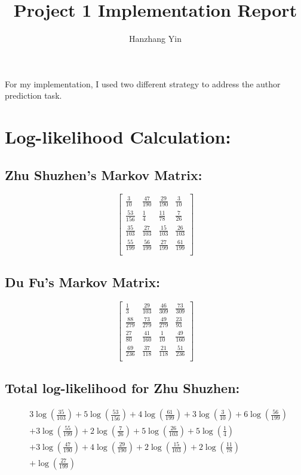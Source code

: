 \documentclass[12pt]{article}
\title{\vspace{-2cm}Project 1 Implementation Report}
\author{Hanzhang Yin}
\begin{document}
\maketitle

\noindent For my implementation, I used two different strategy to address the author prediction task.

\section*{Log-likelihood Calculation: }

\subsection*{Zhu Shuzhen's Markov Matrix:}
\[
\begin{bmatrix}
\frac{3}{10} & \frac{47}{190} & \frac{29}{190} & \frac{3}{10} \\
\frac{53}{156} & \frac{1}{4} & \frac{11}{78} & \frac{7}{26} \\
\frac{35}{103} & \frac{27}{103} & \frac{15}{103} & \frac{26}{103} \\
\frac{55}{199} & \frac{56}{199} & \frac{27}{199} & \frac{61}{199} \\
\end{bmatrix}
\]

\subsection*{Du Fu's Markov Matrix:}
\[
\begin{bmatrix}
\frac{1}{3} & \frac{29}{103} & \frac{46}{309} & \frac{73}{309} \\
\frac{88}{279} & \frac{73}{279} & \frac{49}{279} & \frac{23}{93} \\
\frac{27}{80} & \frac{41}{160} & \frac{1}{10} & \frac{49}{160} \\
\frac{69}{236} & \frac{37}{118} & \frac{21}{118} & \frac{51}{236} \\
\end{bmatrix}
\]

\subsection*{Total log-likelihood for Zhu Shuzhen:}
\[
\begin{aligned}
    &3\log\left(\frac{35}{103}\right) + 5\log\left(\frac{53}{156}\right) + 4\log\left(\frac{61}{199}\right) + 3\log\left(\frac{3}{10}\right) + 6\log\left(\frac{56}{199}\right) \\
    &+ 3\log\left(\frac{55}{199}\right) + 2\log\left(\frac{7}{26}\right) + 5\log\left(\frac{26}{103}\right) + 5\log\left(\frac{1}{4}\right) \\
    &+ 3\log\left(\frac{47}{190}\right) + 4\log\left(\frac{29}{190}\right) + 2\log\left(\frac{15}{103}\right) + 2\log\left(\frac{11}{78}\right) \\
    &+ \log\left(\frac{27}{199}\right)
\end{aligned}
\]
\end{document}
